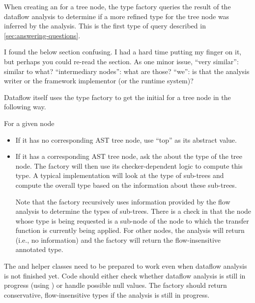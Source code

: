 When creating an  for a tree node, the type factory
queries the result of the dataflow analysis to determine if a more refined
type for the tree node was inferred by the analysis. This is the first
type of query described in \autoref{sec:answering-questions}.

\begin{workinprogress}
I found the below section confusing.  I had a hard time putting my finger
on it, but perhaps you could re-read the section.  As one minor issue,
``very similar'':  similar to what?  ``intermediary nodes'':  what are
those?  ``we'':  is that the analysis writer or the framework implementor
(or the runtime system)?
\end{workinprogress}

Dataflow itself uses the type factory to get the initial
 for a tree node in the following way.

For a given node 
\begin{itemize}
\item
    If it has no corresponding AST tree node, use ``top'' as its
    abstract value.
\item
    If it has a corresponding AST tree node, ask the
     about the type of the tree node.  The
    factory will then use its checker-dependent logic to compute this
    type.  A typical implementation will look at the type of sub-trees
    and compute the overall type based on the information about these
    sub-trees.

    Note that the factory recursively uses information provided by the
    flow analysis to determine the types of sub-trees.  There is a
    check in  that the node whose type is
    being requested is a sub-node of the node to which the transfer
    function is currently being applied.  For other nodes, the
    analysis will return  (i.e., no information) and the
    factory will return the flow-insensitive annotated type.

\end{itemize}

The  and helper classes need to be prepared to work
even when dataflow analysis is not finished yet. Code should either check
whether dataflow analysis is still in progress (using
) or handle possible null values. The factory should
return conservative, flow-insensitive types if the analysis is still in
progress.


